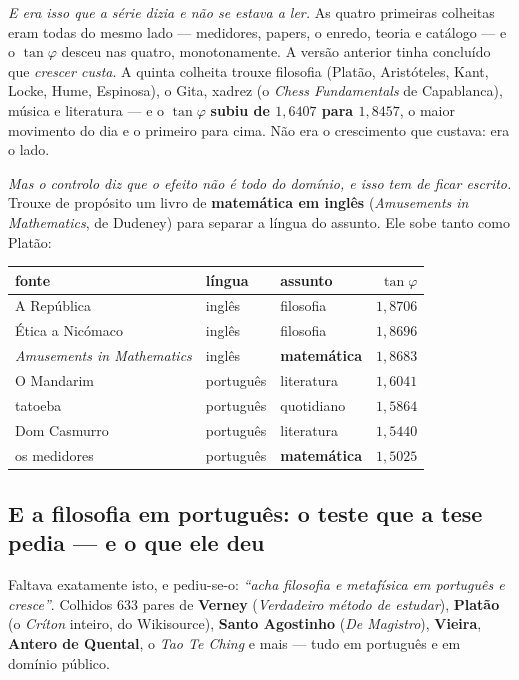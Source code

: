 \documentclass[11pt]{article}
\theoremstyle{plain}
\theoremstyle{remark}
\begin{document}
\begin{itemize}
\emph{E era isso que a série dizia e não se estava a ler.} As quatro primeiras colheitas eram todas
do mesmo lado --- medidores, papers, o enredo, teoria e catálogo --- e o $\tan\varphi$ desceu nas
quatro, monotonamente. A versão anterior tinha concluído que \emph{crescer custa}. A quinta colheita trouxe
filosofia (Platão, Aristóteles, Kant, Locke, Hume, Espinosa), o Gita, xadrez (o
\emph{Chess Fundamentals} de Capablanca), música e literatura --- e o $\tan\varphi$
\textbf{subiu de $1{,}6407$ para $1{,}8457$}, o maior movimento do dia e o primeiro para cima.
Não era o crescimento que custava: era o lado.

\emph{Mas o controlo diz que o efeito não é todo do domínio, e isso tem de ficar escrito.}
Trouxe de propósito um livro de \textbf{matemática em inglês} (\emph{Amusements in Mathematics},
de Dudeney) para separar a língua do assunto. Ele sobe tanto como Platão:

\begin{center}\small
\begin{tabular}{lllr}
\hline
fonte & língua & assunto & $\tan\varphi$ \\ \hline
A República & inglês & filosofia & $1{,}8706$ \\
Ética a Nicómaco & inglês & filosofia & $1{,}8696$ \\
\emph{Amusements in Mathematics} & inglês & \textbf{matemática} & $1{,}8683$ \\ \hline
O Mandarim & português & literatura & $1{,}6041$ \\
tatoeba & português & quotidiano & $1{,}5864$ \\
Dom Casmurro & português & literatura & $1{,}5440$ \\
os medidores & português & \textbf{matemática} & $1{,}5025$ \\
\hline
\end{tabular}
\end{center}

\subsection*{E a filosofia em português: o teste que a tese pedia --- e o que ele deu}

Faltava exatamente isto, e pediu-se-o: \emph{``acha filosofia e metafísica em português e
cresce''}. Colhidos $633$ pares de \textbf{Verney} (\emph{Verdadeiro método de estudar}),
\textbf{Platão} (o \emph{Críton} inteiro, do Wikisource), \textbf{Santo Agostinho}
(\emph{De Magistro}), \textbf{Vieira}, \textbf{Antero de Quental}, o \emph{Tao Te Ching} e mais
--- tudo em português e em domínio público.


\end{itemize}
\end{document}
